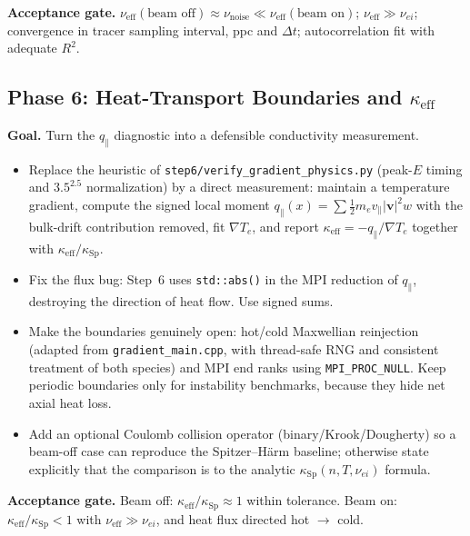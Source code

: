 \documentclass[11pt,a4paper]{article}
\begin{document}
\textbf{Acceptance gate.} $\nu_{\mathrm{eff}}(\text{beam off})\approx\nu_{\mathrm{noise}}
\ll \nu_{\mathrm{eff}}(\text{beam on})$; $\nu_{\mathrm{eff}}\gg\nu_{ei}$; convergence in tracer
sampling interval, ppc and $\Delta t$; autocorrelation fit with adequate $R^2$.

\subsection{Phase 6: Heat-Transport Boundaries and $\kappa_{\mathrm{eff}}$}

\textbf{Goal.} Turn the $q_\parallel$ diagnostic into a defensible conductivity measurement.

\begin{itemize}[leftmargin=*]
  \item Replace the heuristic of \texttt{step6/verify\_gradient\_physics.py} (peak-$E$ timing and
        $3.5^{2.5}$ normalization) by a direct measurement: maintain a temperature gradient,
        compute the signed local moment
        $q_\parallel(x)=\sum \frac12 m_e v_\parallel|\mathbf{v}|^2 w$ with the bulk-drift
        contribution removed, fit $\nabla T_e$, and report $\kappa_{\mathrm{eff}}=-q_\parallel/\nabla T_e$
        together with $\kappa_{\mathrm{eff}}/\kappa_{\mathrm{Sp}}$.
  \item Fix the flux bug: Step~6 uses \texttt{std::abs()} in the MPI reduction of $q_\parallel$,
        destroying the direction of heat flow. Use signed sums.
  \item Make the boundaries genuinely open: hot/cold Maxwellian reinjection (adapted from
        \texttt{gradient\_main.cpp}, with thread-safe RNG and consistent treatment of both
        species) and MPI end ranks using \texttt{MPI\_PROC\_NULL}. Keep periodic boundaries only
        for instability benchmarks, because they hide net axial heat loss.
  \item Add an optional Coulomb collision operator (binary/Krook/Dougherty) so a beam-off case can
        reproduce the Spitzer--H\"arm baseline; otherwise state explicitly that the comparison is
        to the analytic $\kappa_{\mathrm{Sp}}(n,T,\nu_{ei})$ formula.
\end{itemize}

\textbf{Acceptance gate.} Beam off: $\kappa_{\mathrm{eff}}/\kappa_{\mathrm{Sp}}\approx1$ within
tolerance. Beam on: $\kappa_{\mathrm{eff}}/\kappa_{\mathrm{Sp}}<1$ with
$\nu_{\mathrm{eff}}\gg\nu_{ei}$, and heat flux directed hot $\rightarrow$ cold.
\end{document}
